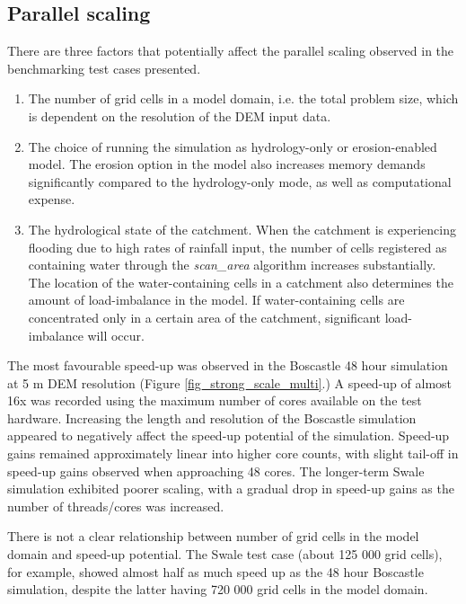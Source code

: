 \subsection{Parallel scaling}
There are three factors that potentially affect the parallel scaling observed in the benchmarking test cases presented. 
\begin{enumerate}
\item The number of grid cells in a model domain, i.e. the total problem size, which is dependent on the resolution of the DEM input data. 
\item The choice of running the simulation as hydrology-only or erosion-enabled model. The erosion option in the model also increases memory demands significantly compared to the hydrology-only mode, as well as computational expense.
\item The hydrological state of the catchment. When the catchment is experiencing flooding due to high rates of rainfall input, the number of cells registered as containing water through the \textit{scan\_area} algorithm increases substantially. The location of the water-containing cells in a catchment also determines the amount of load-imbalance in the model. If water-containing cells are concentrated only in a certain area of the catchment, significant load-imbalance will occur. 
\end{enumerate}

The most favourable speed-up was observed in the Boscastle 48 hour simulation at 5 m DEM resolution (Figure \ref{fig_strong_scale_multi}.) A speed-up of almost 16x was recorded using the maximum number of cores available on the test hardware. Increasing the length and resolution of the Boscastle simulation appeared to negatively affect the speed-up potential of the simulation. Speed-up gains remained approximately linear into higher core counts, with slight tail-off in speed-up gains observed when approaching 48 cores. The longer-term Swale simulation exhibited poorer scaling, with a gradual drop in speed-up gains as the number of threads/cores was increased. 

There is not a clear relationship between number of grid cells in the model domain and speed-up potential. The Swale test case (about 125 000 grid cells), for example, showed almost half as much speed up as the 48 hour Boscastle simulation, despite the latter having 720 000 grid cells in the model domain. 

